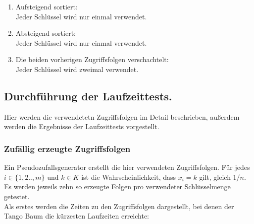 \documentclass[a4paper,12pt]{article}
\begin{document}
\begin{enumerate}
  \item Aufsteigend sortiert:\\
  Jeder Schlüssel wird nur einmal verwendet.
  \item Absteigend sortiert:\\
  Jeder Schlüssel wird nur einmal verwendet.
  \item  Die beiden vorherigen Zugriffsfolgen verschachtelt:\\
  Jeder Schlüssel wird zweimal verwendet.
 \end{enumerate}



\subsection{Durchführung der Laufzeittests.} 
Hier werden die verwendetetn Zugriffsfolgen  im Detail beschrieben, außerdem werden die Ergebnisse der Laufzeittests vorgestellt.
\subsubsection{Zufällig erzeugte Zugriffsfolgen}
	Ein Pseudozufallsgenerator erstellt die hier verwendeten Zugriffsfolgen. Für jedes $i \in \{1,2..,m\}$ und $k \in K$ ist die Wahrscheinlichkeit, dass $x_i = k$ gilt, gleich $1 /n$. Es werden jeweils zehn so erzeugte Folgen pro verwendeter Schlüsselmenge getestet. \label{zufZu} \\
	Als erstes werden die Zeiten zu den Zugriffsfolgen dargestellt, bei denen der Tango Baum die kürzesten  Laufzeiten erreichte:
\end{document}
